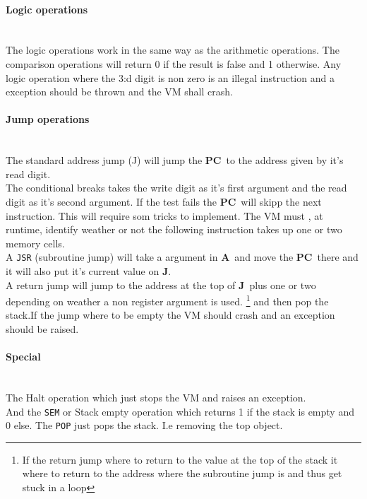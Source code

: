 \documentclass{article}
\newcommand{\V}{\verb}
\newcommand{\A}{$\textbf{A}$}
\newcommand{\pc}{$\textbf{PC}$}
\newcommand{\J}{$\textbf{J}$}
\begin{document}
\paragraph{Logic operations} \
\\
The logic operations work in the same way as the arithmetic operations. The
comparison operations will return 0 if the result is false and 1 otherwise.
Any logic operation where the 3:d digit is non zero is an illegal instruction
and a exception should be thrown and the VM shall crash.

\paragraph{Jump operations} \
\\
The standard address jump (J) will jump the \pc \ to the address given by it's
read digit.\\
The conditional breaks takes the write digit as it's first argument and the read
digit as it's second argument. If the test fails the \pc \ will skipp the next
instruction. This will require som tricks to implement. The VM must , at
runtime, identify weather or not the following instruction takes up one or two
memory cells.\\

A \V+JSR+ (subroutine jump) will take a argument in \A \ and move the \pc \
there and it will also put it's current value on \J.\\
A return jump will jump to the address at the top of \J \ plus one or two
depending on weather a non register argument is used.
 \footnote{If the return jump where to return to the value at the top of the
 stack it where to return to the address where the subroutine jump is and thus
 get stuck in a loop} and then pop the stack.If the jump where to be empty the
 VM should crash and an exception should be raised.\\


\paragraph{Special}\
\\
The Halt operation which just stops the VM and
raises an exception.\\
And the \V+SEM+ or Stack empty operation which returns 1 if the stack is empty
and 0 else.
The \V+POP+ just pops the stack. I.e removing the top object.
\end{document}

